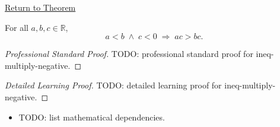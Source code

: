 \newpage
{}
\label{prf:ineq-multiply-negative}

\begin{remark*}[Return]
\hyperref[thm:ineq-multiply-negative]{Return to Theorem}
\end{remark*}

\begin{theorem*}
For all $a, b, c \in \mathbb{R}$,
\[
  a < b \;\land\; c < 0 \;\Rightarrow\; ac > bc.
\]
\end{theorem*}

\begin{proof}[Professional Standard Proof]
\LRAProofBodyStart
TODO: professional standard proof for ineq-multiply-negative.
\end{proof}

\begin{proof}[Detailed Learning Proof]
\LRAProofBodyStart
TODO: detailed learning proof for ineq-multiply-negative.
\end{proof}

\begin{remark*}
\end{remark*}

\begin{dependencies}
\begin{itemize}
  \item TODO: list mathematical dependencies.
\end{itemize}
\end{dependencies}

\clearpage

